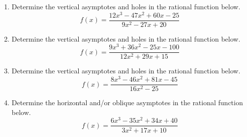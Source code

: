 \documentclass[14pt]{extbook}
\begin{document}
\begin{enumerate}
\item{
Determine the vertical asymptotes and holes in the rational function below.\[ f(x) = \frac{12x^{3} -47 x^{2} +60 x -25}{9x^{2} -27 x + 20} \]} \newpage
\item{
Determine the vertical asymptotes and holes in the rational function below.\[ f(x) = \frac{9x^{3} +36 x^{2} -25 x -100}{12x^{2} +29 x + 15} \]} \newpage
\item{
Determine the vertical asymptotes and holes in the rational function below.\[ f(x) = \frac{8x^{3} -46 x^{2} +81 x -45}{16x^{2} -25} \]} \newpage
\item{
Determine the horizontal and/or oblique asymptotes in the rational function below.\[ f(x) = \frac{6x^{3} -35 x^{2} +34 x + 40}{3x^{2} +17 x + 10} \]} \newpage
\end{enumerate}
\end{document}
